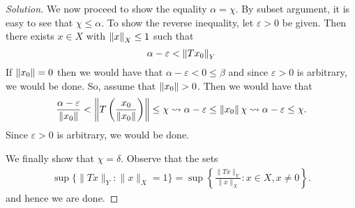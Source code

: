 \begin{proof}[Solution]
    We now proceed to show the equality $\alpha = \chi$. By subset argument, it is easy to see that $\chi \le \alpha$. To show the reverse inequality, let $\varepsilon > 0$ be given. Then there exists $x \in X$ with $\left\lVert x \right\rVert_{X} \le 1$ such that
    \begin{equation*}
	\alpha - \varepsilon < \left\lVert Tx_{0} \right\rVert_{Y}
    \end{equation*}
    If $\left\lVert x_{0} \right\rVert=0$ then we would have that $\alpha - \varepsilon < 0 \le \beta$ and since $\varepsilon > 0$ is arbitrary, we would be done. So, assume that $\left\lVert x_{0} \right\rVert > 0$. Then we would have that 
    \begin{align*}
	\frac{\alpha - \varepsilon}{ \left\lVert x_{0} \right\rVert} < \left\lVert T\left( \frac{x_{0}}{\left\lVert x_{0} \right\rVert} \right) \right\rVert \le \chi
	\leadsto \alpha - \varepsilon \le \left\lVert x_{0} \right\rVert \chi \leadsto \alpha - \varepsilon \le \chi.
    \end{align*}
    Since $\varepsilon > 0$ is arbitrary, we would be done.

    We finally show that $\chi = \delta$. Observe that the sets
    \begin{align*}
	\sup \{ \|Tx\|_Y : \|x\|_X =1\}
	= \sup \left\{ \frac{\|Tx\|_Y}{\|x\|_X} : x\in X, x\neq 0 \right\}\text{.}
    \end{align*}
    and hence we are done.
\end{proof}
